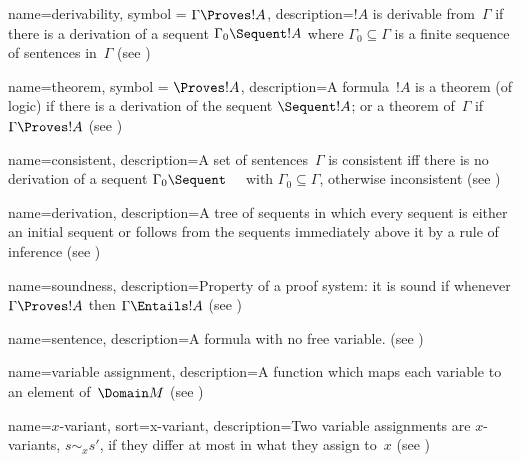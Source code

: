 {}{


 {
  name=derivability,
  symbol = {\ensuremath{\Gamma \Proves !A}},  
  description={$!A$ is {derivable} from~$\Gamma$ if there is a
    \gls{derivation} of a sequent $\Gamma_0 \Sequent !A$ 
    where $\Gamma_0 \subseteq \Gamma$ is a finite sequence of sentences in~$\Gamma$ (see
    )} }

 {
  name={theorem},
  symbol = {\ensuremath{\Proves !A}},
  description={A {formula}~$!A$ is a theorem (of logic) if there is
    a {derivation} of the sequent $\Sequent !A$; or a
    theorem of~$\Gamma$ if $\Gamma \Proves !A$ (see
    )} }

 {
  name=consistent,
  description={A set of sentences~$\Gamma$ is consistent iff there is no \gls{derivation} of a \gls{sequent} $\Gamma_0 \Sequent \quad$ with $\Gamma_0 \subseteq \Gamma$, otherwise inconsistent (see
    )} }

 {
  name=derivation,  
  description={A tree of sequents in which every sequent is either an initial sequent or follows from the sequents immediately above it by a rule of
    inference (see )} }


 {
  name=soundness, 
  description={Property of a proof system: it is sound if whenever
    $\Gamma \Proves !A$ then $\Gamma \Entails !A$ (see
    )} }
}


 {
  name=sentence,  
  description={A {formula} with no \gls{free} variable. (see
    )} }

 {
  name=variable assignment,  
  description={A \gls{function} which maps each {variable} to an element
    of~$\Domain M$ (see )} }

 {
  name=$x$-variant,
  sort={x-variant},
  description={Two \glspl{variable assignment} are $x$-variants, $s \sim_x
    s'$, if they differ at most in what they assign to~$x$ (see
    )} }

